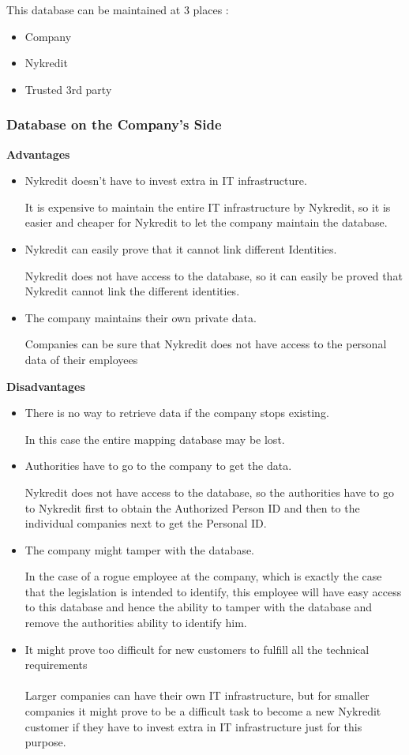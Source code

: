 This database can be maintained at 3 places :
\begin{itemize}
	\item Company 
	\item Nykredit
	\item Trusted 3rd party
\end{itemize}
\subsubsection{Database on the Company's Side}
\textbf{Advantages}
\begin{itemize}
	\item Nykredit doesn’t have to invest extra in IT infrastructure.
	
	It is expensive to maintain the entire IT infrastructure by Nykredit, so it is easier and cheaper for Nykredit to let the company maintain the database.
	\item Nykredit can easily prove that it cannot link different Identities.
	
	Nykredit does not have access to the database, so it can easily be proved that Nykredit cannot link the different identities.
	\item The company maintains their own private data.
	
	Companies can be sure that Nykredit does not have access to the personal data of their employees
\end{itemize}
\textbf{Disadvantages}
\begin{itemize}
	
	\item There is no way to retrieve data if the company stops existing.
	
	In this case the entire mapping database may be lost.
	\item Authorities have to go to the company to get the data.
	
	Nykredit does not have access to the database, so the authorities have to go to Nykredit first to obtain the Authorized Person ID and then to the individual companies next to get the Personal ID.
	\item The company might tamper with the database.
	
	In the case of a rogue employee at the company, which is exactly the case that the legislation is intended to identify, this employee will have easy access to this database and hence the ability to tamper with the database and remove the authorities ability to identify him.
	\item It might prove too difficult for new customers to fulfill all the technical requirements 
	\\
	\\Larger companies can have their own IT infrastructure, but for smaller companies it might prove to be a difficult task to become a new Nykredit customer if they have to invest extra in IT infrastructure just for this purpose.
\end{itemize}

